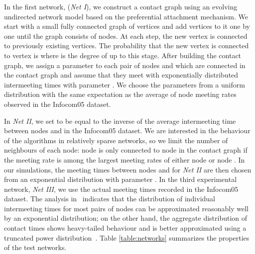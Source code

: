 \documentclass[journal,onecolumn,11pt]{IEEEtran}
\theoremstyle{plain}
\theoremstyle{definition}
\begin{document}
In the first network, ({\em Net I}), we construct a contact graph using
an evolving undirected network model based on the preferential
attachment mechanism. We start with a small fully connected graph of
 vertices and add vertices to it one by one until the
graph consists of  nodes. At each step, the new vertex is
connected to  previously existing vertices. The probability
that the new vertex is connected to vertex  is  where  is the degree of  up to this stage. After
building the contact graph, we assign a parameter  to
each pair of nodes  and  which are connected in the contact
graph and assume that they meet with exponentially distributed
intermeeting times with parameter . We choose the parameters  from a uniform distribution with the same expectation as the average of node meeting rates observed in the Infocom05 dataset. 

In {\em Net II}, we set  to be equal to the inverse of
the average intermeeting time between nodes  and  in the
Infocom05 dataset. We are interested in the behaviour of the
algorithms in relatively sparse networks, so we limit the number of
neighbours of each node: node  is only connected to node  in the
contact graph if the meeting rate  is among the largest
 meeting rates of either node  or node . In our simulations, the meeting
times between nodes  and  for {\em Net II} are then chosen from an exponential
distribution with parameter . In the third experimental
network, {\em Net III}, we use the actual meeting times recorded in
the Infocom05 dataset. The analysis in~\cite{gao2009} indicates that
the distribution of individual intermeeting times for most pairs of
nodes can be approximated reasonably well by an exponential
distribution; on the other hand, the aggregate distribution of contact
times shows heavy-tailed behaviour and is better approximated using a
truncated power distribution~\cite{chaintreau2007impact, cai2009}.
Table \ref{table:networks} summarizes the properties of the test networks.
\end{document}

